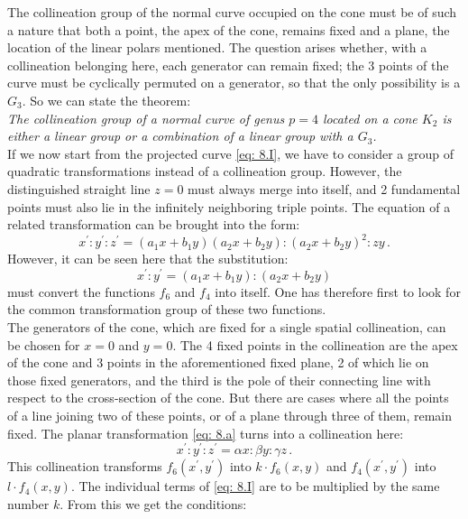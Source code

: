 \documentclass[leqno]{article}
\begin{document}
The collineation group of the normal curve occupied on the cone must be of such a nature that both a point, the apex of the cone, remains fixed and a plane, the location of the linear polars mentioned. The question arises whether, with a collineation belonging here, each generator can remain fixed; the 3 points of the curve must be cyclically permuted on a generator, so that the only possibility is a $G_3$. So we can state the theorem: \\
\textit{The collineation group of a normal curve of genus $p=4$ located on a cone $K_2$ is either a linear group or a combination of a linear group with a $G_3$.} \\
If we now start from the projected curve \eqref{eq: 8.I}, we have to consider a group of quadratic transformations instead of a collineation group. However, the distinguished straight line $z=0$ must always merge into itself, and 2 fundamental points must also lie in the infinitely neighboring triple points. The equation of a related transformation can be brought into the form:
\begin{equation}\label{eq: 8.a}
x^\prime : y^\prime : z^\prime = (a_1 x + b_1 y) (a_2 x + b_2 y) : (a_2 x + b_2 y)^2 : zy \, . \tag{a}
\end{equation}
However, it can be seen here that the substitution: 
\[
x^\prime : y^\prime = (a_1 x + b_1 y) : (a_2 x + b_2 y)
\] 
must convert the functions $f_6$ and $f_4$ into itself. One has therefore first to look for the common transformation group of these two functions. \\
The generators of the cone, which are fixed for a single spatial collineation, can be chosen for $x=0$ and $y=0$. The 4 fixed points in the collineation are the apex of the cone and 3 points in the aforementioned fixed plane, 2 of which lie on those fixed generators, and the third is the pole of their connecting line with respect to the cross-section of the cone. But there are cases where all the points of a line joining two of these points, or of a plane through three of them, remain fixed. The planar transformation \eqref{eq: 8.a} turns into a collineation here:
\begin{equation}\label{eq: 8.aprime}
x^\prime : y^\prime : z^\prime = \alpha x : \beta y : \gamma z \, . \tag{$a^\prime$}
\end{equation}
This collineation transforms $f_6(x^\prime, y^\prime)$ into $k \cdot f_6(x, y)$ and $f_4(x^\prime, y^\prime)$ into $l \cdot f_4(x,y)$. The individual terms of \eqref{eq: 8.I} are to be multiplied by the same number $k$. From this we get the conditions:
\end{document}
